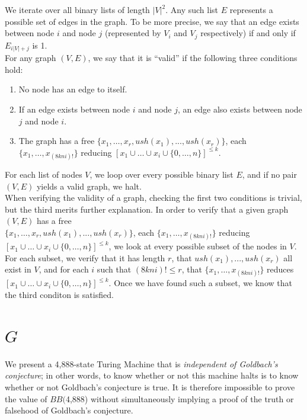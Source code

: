 \documentclass[11pt]{article}
\newcommand{\gbstatenumstate}{4,888-state }
\newcommand{\bbgbstatenum}{$BB($4,888) }
\begin{document}
We iterate over all binary lists of length $|V|^2$. Any such list $E$ represents a possible set of edges in the graph. To be more precise, we say that an edge exists between node $i$ and node $j$ (represented by $V_i$ and $V_j$ respectively) if and only if $E_{i|V| + j}$ is 1. \\

For any graph $(V, E)$, we say that it is ``valid'' if the following three conditions hold:

\begin{enumerate}

\item No node has an edge to itself.
\item If an edge exists between node $i$ and node $j$, an edge also exists between node $j$ and node $i$.
\item The graph has a free $\{x_1,\dots,x_r, ush(x_1),...,ush(x_r)\}$, each  $\{x_1, \dots, x_{(8kni)!}\}$ reducing $[x_1 \cup \dots \cup x_i \cup \{0,\dots,n\}]^{\le k}$.

\end{enumerate}

For each list of nodes $V$, we loop over every possible binary list $E$, and if no pair $(V, E)$ yields a valid graph, we halt. \\

When verifying the validity of a graph, checking the first two conditions is trivial, but the third merits further explanation. In order to verify that a given graph $(V, E)$ has a free \\ $\{x_1,\dots,x_r, ush(x_1),...,ush(x_r)\}$, each  $\{x_1, \dots, x_{(8kni)!}\}$ reducing $[x_1 \cup \dots \cup x_i \cup \{0,\dots,n\}]^{\le k}$, we look at every possible subset of the nodes in $V$. For each subset, we verify that it has length $r$, that $ush(x_1),...,ush(x_r)$ all exist in $V$, and for each $i$ such that $(8kni)! \le r$, that $\{x_1, \dots, x_{(8kni)!}\}$ reduces $[x_1 \cup \dots \cup x_i \cup \{0,\dots,n\}]^{\le k}$. Once we have found such a subset, we know that the third conditon is satisfied.

\section{$G$}

We present a \gbstatenumstate Turing Machine that is \emph{independent of Goldbach's conjecture}; in other words, to know whether or not this machine halts is to know whether or not Goldbach's conjecture is true. It is therefore impossible to prove the value of \bbgbstatenum without simultaneously implying a proof of the truth or falsehood of Goldbach's conjecture.
\end{document}
